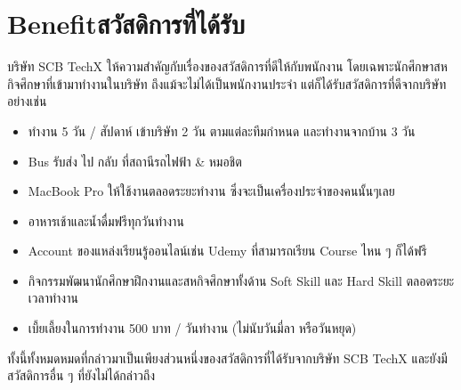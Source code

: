 \section{\ifenglish Benefit\else สวัสดิการที่ได้รับ\fi}
บริษัท SCB TechX ให้ความสำคัญกับเรื่องของสวัสดิการที่ดีให้กับพนักงาน โดยเฉพาะนักศึกษาสหกิจศึกษาที่เข้ามาทำงานในบริษัท
ถึงแม้จะไม่ได้เป็นพนักงานประจำ แต่ก็ได้รับสวัสดิการที่ดีจากบริษัทอย่างเช่น
\begin{itemize}
      \item ทำงาน 5 วัน / สัปดาห์ เข้าบริษัท 2 วัน ตามแต่ละทีมกำหนด และทำงานจากบ้าน 3 วัน
      \item Bus รับส่ง ไป กลับ ที่สถานีรถไฟฟ้า \& หมอชิต
      \item MacBook Pro ให้ใช้งานตลอดระยะทำงาน ซึ่งจะเป็นเครื่องประจำของคนนั้นๆเลย
      \item อาหารเช้าและน้ำดื่มฟรีทุกวันทำงาน
      \item Account ของแหล่งเรียนรู้ออนไลน์เช่น Udemy ที่สามารถเรียน Course ไหน ๆ ก็ได้ฟรี
      \item กิจกรรมพัฒนานักศึกษาฝึกงานและสหกิจศึกษาทั้งด้าน Soft Skill และ Hard Skill ตลอดระยะเวลาทำงาน
      \item เบี้ยเลี้ยงในการทำงาน 500 บาท / วันทำงาน (ไม่นับวันมี่ลา หรือวันหยุด)
\end{itemize}
ทั้งนี้ทั้งหมดหมดที่กล่าวมาเป็นเพียงส่วนหนึ่งของสวัสดิการที่ได้รับจากบริษัท SCB TechX และยังมีสวัสดิการอื่น ๆ ที่ยังไม่ได้กล่าวถึง
